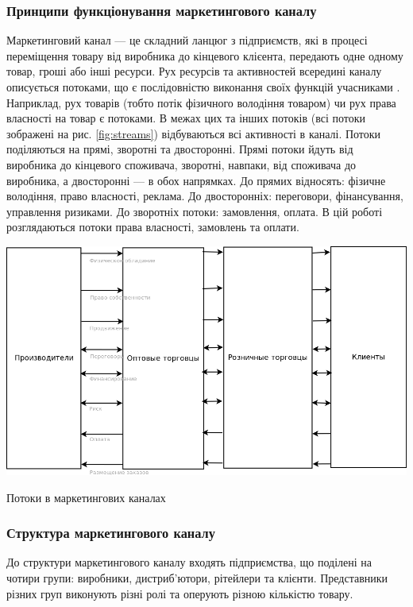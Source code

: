 \subsubsection{Принципи функціонування маркетингового каналу}
Маркетинговий канал --- це складний ланцюг з підприємств, які в процесі переміщення товару від виробника до кінцевого клієента, передають одне одному товар, гроші або інші ресурси. Рух ресурсів та активностей всередині каналу описується потоками, що є послідовністю виконання своїх функцій учасниками \cite{stern}. Наприклад, рух товарів (тобто потік фізичного володіння товаром) чи рух права власності на товар є потоками. В межах цих та інших потоків (всі потоки зображені на рис. \ref{fig:streams}) відбуваються всі активності в каналі. Потоки поділяються на прямі, зворотні та двосторонні. Прямі потоки йдуть від виробника до кінцевого споживача, зворотні, навпаки, від споживача до виробника, а двосторонні --- в обох напрямках. До прямих відносять: фізичне володіння, право власності, реклама. До двосторонніх: переговори, фінансування, управлення ризиками. До зворотніх потоки: замовлення, оплата. В цій роботі розглядаються потоки права власності, замовлень та оплати.
\begin{stdfigure}
\includegraphics[width=6in]{images/streams.png}
\caption{Потоки в маркетингових каналах}
\label{fig:streams}
\end{stdfigure}

\subsubsection{Структура маркетингового каналу}

До структури маркетингового каналу входять підприємства, що поділені на чотири групи: виробники, дистриб’ютори, рітейлери та клієнти. Представники різних груп виконують різні ролі та оперують різною кількістю товару. 

